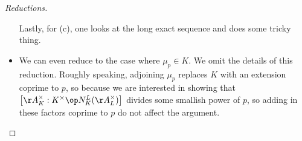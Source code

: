 \documentclass[../notes.tex]{subfiles}
\begin{document}
\begin{proof}[Reductions]
\begin{itemize}
		Lastly, for (c), one looks at the long exact sequence and does some tricky thing.

		\item We can even reduce to the case where $\mu_p\in K$. We omit the details of this reduction. Roughly speaking, adjoining $\mu_p$ replaces $K$ with an extension coprime to $p$, so because we are interested in showing that $\left[\AA_K^\times:K^\times\op N^L_K(\AA_L^\times)\right]$ divides some smallish power of $p$, so adding in these factors coprime to $p$ do not affect the argument.
		\qedhere
	\end{itemize}
\end{proof}
\end{document}
